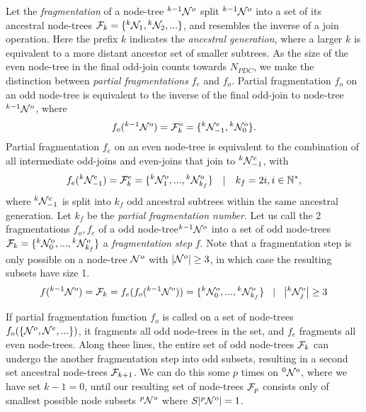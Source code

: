 \begin{definition}\label{def:fragmentation}
  Let the \emph{fragmentation} of a node-tree ${}^{k-1}\mathcal{N}^o$ split ${}^{k-1}\mathcal{N}^o$ into a set of its ancestral node-trees $\mathcal{F}_k = \{{}^{k}\mathcal{N}_1, {}^{k}\mathcal{N}_2, ...\}$, and resembles the inverse of a join operation. Here the prefix $k$ indicates the \emph{ancestral generation}, where a larger $k$ is equivalent to a more distant ancestor set of smaller subtrees. As the size of the even node-tree in the final odd-join counts towards $N_{PDC}$, we make the distinction between \emph{partial fragmentations} $f_e$ and $f_o$. Partial fragmentation $f_o$ on an odd node-tree is equivalent to the inverse of the final odd-join to node-tree ${}^{k-1}\mathcal{N}^o$, where
  \begin{equation}\label{eq:pfe}
    f_o({}^{k-1}\mathcal{N}^o) = \mathcal{F}^o_k = \{{}^{k}\mathcal{N}^e_{-1}, {}^{k}\mathcal{N}^o_0 \}.
  \end{equation}
  Partial fragmentation $f_e$ on an even node-tree is equivalent to the combination of all intermediate odd-joins and even-joins that join to ${}^{k}\mathcal{N}^e_{-1}$, with
  \begin{equation}\label{eq:pfo}
    f_e({}^{k}\mathcal{N}^e_{-1}) = \mathcal{F}^e_k=\{{}^{k}\mathcal{N}^{o}_1,...,{}^{k}\mathcal{N}^o_{k_f}\} \hspace{1em} | \hspace{1em} k_f = 2i, i \in \mathbb{N}^*,
  \end{equation}
  where ${}^{k}\mathcal{N}^e_{-1}$ is split into $k_f$ odd ancestral subtrees within the same ancestral generation. Let $k_f$ be the \emph{partial fragmentation number}. Let us call the 2 fragmentations $f_o, f_e$ of a odd node-tree${}^{k-1}\mathcal{N}^o$ into a set of odd node-trees $\mathcal{F}_k = \{{}^{k}\mathcal{N}^o_0,..., {}^{k}\mathcal{N}^{o}_{k_f}\}$ a \emph{fragmentation step} $f$. Note that a fragmentation step is only possible on a node-tree $\mathcal{N}^o$ with $|{\mathcal{N}^o}| \geq 3$, in which case the resulting subsets have size 1.
  \begin{equation}\label{eq:fstep}
    f({}^{k-1}\mathcal{N}^o) = \mathcal{F}_k = f_e(f_o({}^{k-1}\mathcal{N}^o)) = \{{}^{k}\mathcal{N}^o_0,...,{}^{k}\mathcal{N}^{o}_{k_f}\} \hspace{.3cm} | \hspace{.3cm} \abs{{{}^{k}\mathcal{N}^o_j}} \geq 3
  \end{equation}
\end{definition}



If partial fragmentation function $f_o$ is called on a set of node-trees $f_o(\{\mathcal{N}^o, \mathcal{N}^e, ...\})$, it fragments all odd node-trees in the set, and $f_e$ fragments all even node-trees. Along these lines, the entire set of odd node-trees $\mathcal{F}_k$ can undergo the another fragmentation step into odd subsets, resulting in a second set ancestral node-trees $\mathcal{F}_{k+1}$. We can do this some $p$ times on ${}^{0}\mathcal{N}^o$, where we have set $k-1=0$, until our resulting set of node-trees $\mathcal{F}_{p}$ consists only of smallest possible node subsets ${}^{p}\mathcal{N}^o$ where $S|{}^{p}\mathcal{N}^o|=1$. 


